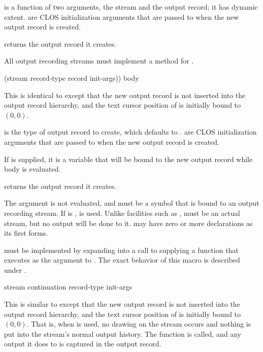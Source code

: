  is a function of two arguments, the stream and the output record;
it has dynamic extent.   are CLOS initialization arguments that
are passed to  when the new output record is created.

 returns the output record it creates.

All output recording streams must implement a method for
.


 {(stream \optional record-type record
                                           \rest init-args))
                                          \body body}

This is identical to  except that the new output record
is not inserted into the output record hierarchy, and the text cursor position
of  is initially bound to $(0,0)$.

 is the type of output record to create, which defaults to
.   are CLOS initialization
arguments that are passed to  when the new output record is
created.

If  is supplied, it is a variable that will be bound to the new
output record while body is evaluated.

 returns the output record it creates.

The  argument is not evaluated, and must be a symbol that is bound to
an output recording stream.  If  is ,  is
used.  Unlike facilities such as ,  must be
an actual stream, but no output will be done to it.   may have zero or
more declarations as its first forms.

 must be implemented by expanding into a call
to  supplying a function that executes
 as the  argument to
.  The exact behavior of this macro is
described under .

 {stream continuation record-type 
                                                   \rest init-args \key}

This is similar to  except that the new output
record is not inserted into the output record hierarchy, and the text cursor
position of  is initially bound to $(0,0)$.  That is, when
 is used, no drawing on the stream
occurs and nothing is put into the stream's normal output history.  The function
 is called, and any output it does to  is captured in
the output record.

